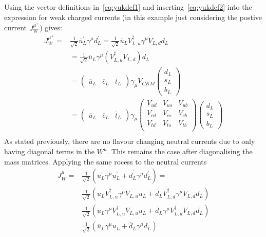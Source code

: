 Using the vector definitions in~\autoref{eq:yukdef1} and inserting~\autoref{eq:yukdef2} into the expression for weak charged currents (in this example just considering the postive current $J^{\mu^{+}}_{W}$) gives:
\begin{equation}
\begin{split}
  J^{\mu^{+}}_{W} =
  & \frac{1}{\sqrt{2}}\overline{u}^{\prime}_{L}\gamma^{\mu}d^{\prime}_{L} = \frac{1}{\sqrt{2}}\overline{u}_{L}V^{\dagger}_{L,u}\gamma^{\mu}V_{L,d}d_{L} \\
  & = \frac{1}{\sqrt{2}}\overline{u}_{L}\gamma^{\mu}(V^{\dagger}_{L,u}V_{L,d})d_{L} \\
  & = \begin{pmatrix}\overline{u}_{L}&\overline{c}_{L}&\overline{t}_{L}\end{pmatrix}\gamma_{\mu}V_{CKM}\begin{pmatrix}d_{L}\\s_{L}\\b_{L}\end{pmatrix} \\
  & = \begin{pmatrix}\overline{u}_{L}&\overline{c}_{L}&\overline{t}_{L}\end{pmatrix}\gamma_{\mu}\begin{pmatrix}V_{ud}&V_{us}&V_{ub}\\V_{cd}&V_{cs}&V_{cb}\\V_{td}&V_{ts}&V_{tb}\\\end{pmatrix} \begin{pmatrix}  d_{L}\\s_{L}\\b_{L}\end{pmatrix} \\
  \end{split}
\end{equation}
As stated previously, there are no flavour changing neutral currents due to only having diagonal terms in the $W^{\mu}$. This remains the case after diagonalising the mass matrices. Applying the same rocess to the neutral currents
\begin{equation}
  \begin{split}
  J^{\mu}_{W} =
  & \frac{1}{\sqrt{2}}(\overline{u}^{\prime}_{L}\gamma^{\mu}u^{\prime}_{L}  + \overline{d}^{\prime}_{L}\gamma^{\mu}d^{\prime}_{L}) = \\
  & \frac{1}{\sqrt{2}}(\overline{u}_{L}V^{\dagger}_{L,u}\gamma^{\mu}V_{L,u}u_{L}  + \overline{d}_{L}V^{\dagger}_{L,d}\gamma^{\mu}V_{L,d}d_{L}) \\
  & \frac{1}{\sqrt{2}}(\overline{u}_{L}\gamma^{\mu}V^{\dagger}_{L,u}V_{L,u}u_{L}  + \overline{d}_{L}\gamma^{\mu}V^{\dagger}_{L,d}V_{L,d}d_{L}) \\
  & \frac{1}{\sqrt{2}}(\overline{u}_{L}\gamma^{\mu}u_{L}  + \overline{d}_{L}\gamma^{\mu}d_{L}) \\
  \end{split}
\end{equation}
